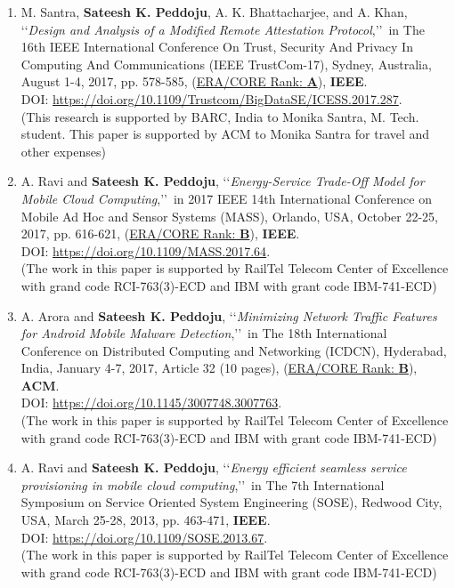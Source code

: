 \begin{enumerate}%


	\item
	M. Santra, \textbf{Sateesh K. Peddoju}, A. K. Bhattacharjee, and A. Khan, \lq\lq \textit{Design and Analysis of a Modified Remote Attestation Protocol},\rq\rq\, in The 16th IEEE International Conference On Trust, Security And Privacy In Computing And Communications (IEEE TrustCom-17), Sydney, Australia, August 1-4, 2017,  pp. 578-585, (\underline{ERA/CORE Rank: \textbf{A}}), \textbf{IEEE}. \\DOI: \url{https://doi.org/10.1109/Trustcom/BigDataSE/ICESS.2017.287}.	\\(This research is supported by BARC, India to Monika Santra, M. Tech. student. This paper is supported by ACM to Monika Santra for travel and other expenses)

	
	\item
	A. Ravi and \textbf{Sateesh K. Peddoju}, \lq\lq \textit{Energy-Service Trade-Off Model for Mobile Cloud Computing},\rq\rq\, in 2017 IEEE 14th International Conference on Mobile Ad Hoc and Sensor Systems (MASS), Orlando, USA, October 22-25, 2017, pp. 616-621, (\underline{ERA/CORE Rank: \textbf{B}}), \textbf{IEEE}. \\DOI: \url{https://doi.org/10.1109/MASS.2017.64}. \\(The work in this paper is supported by RailTel Telecom Center of Excellence with grand code RCI-763(3)-ECD and IBM with grant code IBM-741-ECD)
	
	\item
	A. Arora and \textbf{Sateesh K. Peddoju}, \lq\lq \textit{Minimizing Network Traffic Features for Android Mobile Malware Detection},\rq\rq\, in The 18th International Conference on Distributed Computing and Networking (ICDCN), Hyderabad, India, January 4-7, 2017, Article 32 (10 pages), (\underline{ERA/CORE Rank: \textbf{B}}), \textbf{ACM}.  \\DOI: \url{https://doi.org/10.1145/3007748.3007763}. \\(The work in this paper is supported by RailTel Telecom Center of Excellence with grand code RCI-763(3)-ECD and IBM with grant code IBM-741-ECD)
	
	\item
	A. Ravi and \textbf{Sateesh K. Peddoju}, \lq\lq \textit{Energy efficient seamless service provisioning in mobile cloud computing},\rq\rq\, in The 7th International Symposium on Service Oriented System Engineering (SOSE), Redwood City, USA, March 25-28, 2013, pp. 463-471, \textbf{IEEE}. \\DOI: \url{https://doi.org/10.1109/SOSE.2013.67}. \\(The work in this paper is supported by RailTel Telecom Center of Excellence with grand code RCI-763(3)-ECD and IBM with grant code IBM-741-ECD)

	
	\end{enumerate}